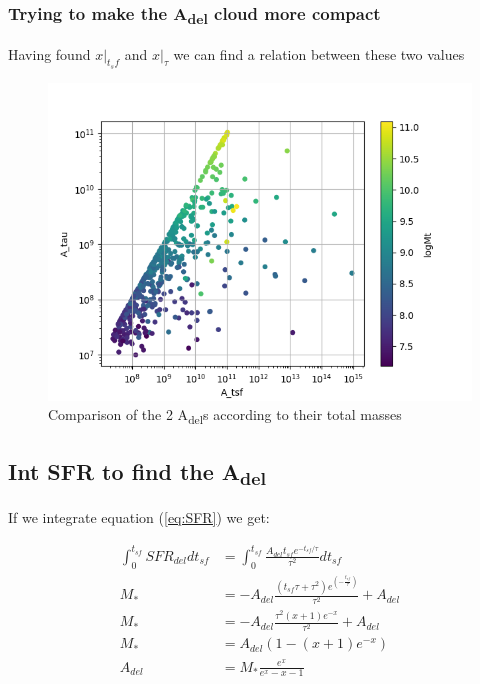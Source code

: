\documentclass[a4paper,twocolumn]{article}
\begin{document}
\subsubsection{Trying to make the A\textsubscript{del} cloud more compact}
\label{sec:org4bf81bb}

Having found \(x|_{t_sf}\) and \(x|_{\tau}\) we can find a relation between these two values

\begin{figure}[!htpb]
\centering
\includegraphics[width=.9\linewidth]{./figs/A_tau-A_tsf_Mt.png}
\caption{\label{fig:Comparison of the 2 A_{del}s according to their total masses}Comparison of the 2 A\textsubscript{del}s according to their total masses}
\end{figure}


\subsection{Int SFR to find the A\textsubscript{del}}
\label{sec:org6350c57}

If we integrate equation (\ref{eq:SFR}) we get:


\begin{equation}\label{eq:int SFR}
\begin{align}
\int^{t_{sf}}_0 SFR_{del} dt_{sf}&=\int^{t_{sf}}_0 \frac{A_{del}t_{sf}e^{-t_{sf}/\tau}}{\tau^2} dt_{sf}\\
M_*&=-A_{del} \frac{{\left(t_{\mathit{sf}} \tau + \tau^{2}\right)} e^{\left(-\frac{t_{\mathit{sf}}}{\tau}\right)}}{\tau^{2}}+A_{del}\\
M_*&=-A_{del}\frac{\tau^2(x+1)e^{-x}}{\tau^2}+A_{del}\\
M_*& = A_{del}(1-(x+1)e^{-x})\\
A_{del}&=M_*\frac{e^x}{e^x-x-1}
\end{align}
\end{equation}
\end{document}
